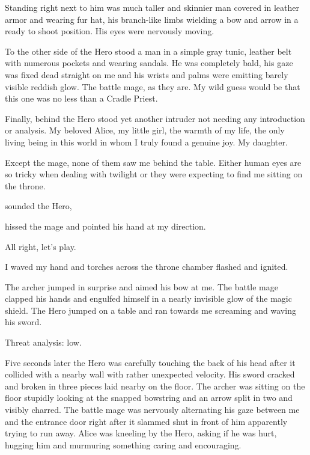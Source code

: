 Standing right next to him was much taller and skinnier man covered in leather armor and wearing fur hat, his branch-like limbs wielding a bow and arrow in a ready to shoot position. His eyes were nervously moving.

To the other side of the Hero stood a man in a simple gray tunic, leather belt with numerous pockets and wearing sandals. He was completely bald, his gaze was fixed dead straight on me and his wrists and palms were emitting barely visible reddish glow. The battle mage, as they are. My wild guess would be that this one was no less than a Cradle Priest.

Finally, behind the Hero stood yet another intruder not needing any introduction or analysis. My beloved Alice, my little girl, the warmth of my life, the only living being in this world in whom I truly found a genuine joy. My daughter.

Except the mage, none of them saw me behind the table. Either human eyes are so tricky when dealing with twilight or they were expecting to find me sitting on the throne.

 sounded the Hero, 

 hissed the mage and pointed his hand at my direction.

All right, let’s play.

 I waved my hand and torches across the throne chamber flashed and ignited. 

The archer jumped in surprise and aimed his bow at me. The battle mage clapped his hands and engulfed himself in a nearly invisible glow of the magic shield. The Hero jumped on a table and ran towards me screaming and waving his sword.

Threat analysis: low.

Five seconds later the Hero was carefully touching the back of his head after it collided with a nearby wall with rather unexpected velocity. His sword cracked and broken in three pieces laid nearby on the floor. The archer was sitting on the floor stupidly looking at the snapped bowstring and an arrow split in two and visibly charred. The battle mage was nervously alternating his gaze between me and the entrance door right after it slammed shut in front of him apparently trying to run away. Alice was kneeling by the Hero, asking if he was hurt, hugging him and murmuring something caring and encouraging.

